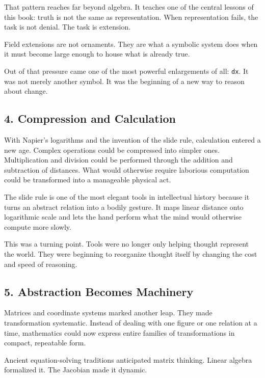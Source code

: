 \documentclass[
]{article}
\begin{document}
That pattern reaches far beyond algebra. It teaches one of the central
lessons of this book: truth is not the same as representation. When
representation fails, the task is not denial. The task is extension.

Field extensions are not ornaments. They are what a symbolic system does
when it must become large enough to house what is already true.

Out of that pressure came one of the most powerful enlargements of all:
\texttt{dx}. It was not merely another symbol. It was the beginning of a
new way to reason about change.

\hypertarget{compression-and-calculation}{%
\subsection{4. Compression and
Calculation}\label{compression-and-calculation}}

With Napier's logarithms and the invention of the slide rule,
calculation entered a new age. Complex operations could be compressed
into simpler ones. Multiplication and division could be performed
through the addition and subtraction of distances. What would otherwise
require laborious computation could be transformed into a manageable
physical act.

The slide rule is one of the most elegant tools in intellectual history
because it turns an abstract relation into a bodily gesture. It maps
linear distance onto logarithmic scale and lets the hand perform what
the mind would otherwise compute more slowly.

This was a turning point. Tools were no longer only helping thought
represent the world. They were beginning to reorganize thought itself by
changing the cost and speed of reasoning.

\hypertarget{abstraction-becomes-machinery}{%
\subsection{5. Abstraction Becomes
Machinery}\label{abstraction-becomes-machinery}}

Matrices and coordinate systems marked another leap. They made
transformation systematic. Instead of dealing with one figure or one
relation at a time, mathematics could now express entire families of
transformations in compact, repeatable form.

Ancient equation-solving traditions anticipated matrix thinking. Linear
algebra formalized it. The Jacobian made it dynamic.
\end{document}
